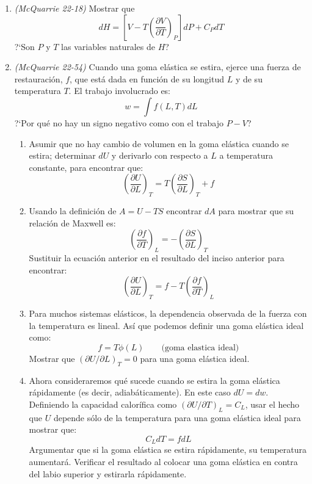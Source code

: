 \documentclass[a4paper,12pt]{article}
\begin{document}
\begin{enumerate}
 \item \textit{(McQuarrie 22-18)} Mostrar que
$$dH=\left[V-T\left(\frac{\partial V}{\partial T}\right)_P\right]dP+C_PdT$$ 
?`Son $P$ y $T$ las variables naturales de $H$? %

 \item \textit{(McQuarrie 22-54)} Cuando una goma el\'astica se estira, ejerce una fuerza de restauraci\'on, $f$, que est\'a dada en funci\'on de su longitud $L$ y de su temperatura $T$. El trabajo involucrado es:
$$w=\int f(L,T)dL$$
?`Por qu\'e no hay un signo negativo como con el trabajo $P-V$? 
 \begin{enumerate}
  \item Asumir que no hay cambio de volumen en la goma el\'astica cuando se estira; determinar $dU$ y derivarlo con respecto a $L$ a temperatura constante, para encontrar que:
$$\left(\frac{\partial U}{\partial L}\right)_T=T\left(\frac{\partial S}{\partial L}\right)_T+f$$
  \item Usando la definici\'on de $A=U-TS$ encontrar $dA$ para mostrar que su relaci\'on de Maxwell es:
$$\left(\frac{\partial f}{\partial T}\right)_L=-\left(\frac{\partial S}{\partial L}\right)_T$$
Sustituir la ecuaci\'on anterior en el resultado del inciso anterior para encontrar:
$$\left(\frac{\partial U}{\partial L}\right)_T=f-T\left(\frac{\partial f}{\partial T}\right)_L$$
  \item Para muchos sistemas el\'asticos, la dependencia observada de la fuerza con la temperatura es lineal. As\'i que podemos definir una goma el\'astica ideal como:
$$f=T\phi(L)\quad\quad\mbox{(goma elastica ideal)}$$
Mostrar que $(\partial U/\partial L)_T=0$ para una goma el\'astica ideal.
  \item Ahora consideraremos qu\'e sucede cuando se estira la goma el\'astica r\'apidamente (es decir, adiab\'aticamente). En este caso $dU=dw$. Definiendo la capacidad calor\'ifica como $(\partial U/\partial T)_L=C_L$, usar el hecho que $U$ depende s\'olo de la temperatura para una goma el\'astica ideal para mostrar que:
$$C_LdT=fdL$$
Argumentar que si la goma el\'astica se estira r\'apidamente, su temperatura aumentar\'a. Verificar el resultado al colocar una goma el\'astica en contra del labio superior y estirarla r\'apidamente.
 \end{enumerate} %

\end{enumerate}
 
\end{document}
